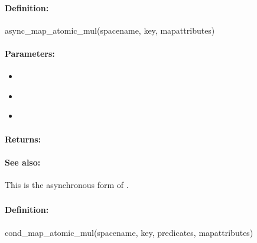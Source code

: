 \paragraph{Definition:}
\begin{rubycode}
async_map_atomic_mul(spacename, key, mapattributes)
\end{rubycode}

\paragraph{Parameters:}
\begin{itemize}[noitemsep]
\item {}\\

\item {}\\

\item {}\\

\end{itemize}

\paragraph{Returns:}


\paragraph{See also:}  This is the asynchronous form of .

\pagebreak
\subsubsection{}
\label{api:ruby:cond_map_atomic_mul}


\paragraph{Definition:}
\begin{rubycode}
cond_map_atomic_mul(spacename, key, predicates, mapattributes)
\end{rubycode}

